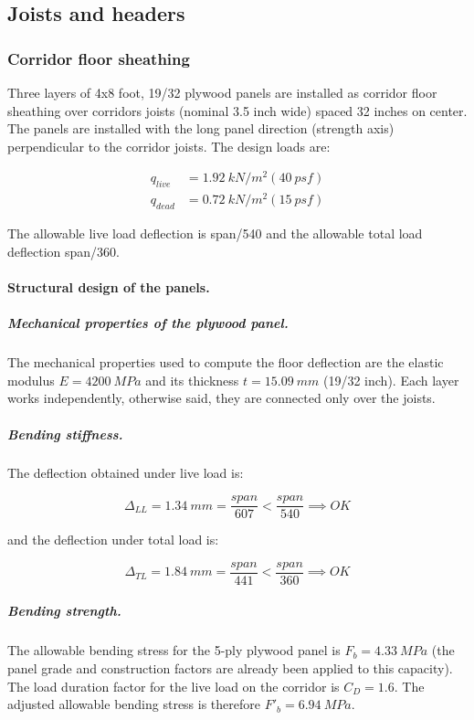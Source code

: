 \subsection{Joists and headers}

\subsubsection{Corridor floor sheathing}
Three layers of 4x8 foot, 19/32 plywood panels are installed as corridor floor sheathing over corridors joists (nominal 3.5 inch wide) spaced 32 inches on center. The panels are installed with the long panel direction (strength axis) perpendicular to the corridor joists. The design loads are:

\begin{align}
  q_{live}&= 1.92\ kN/m^2 (40\ psf) \\
  q_{dead}&= 0.72\ kN/m^2 (15\ psf)
\end{align}

The allowable live load deflection is span/540 and the allowable total load deflection span/360.

\paragraph{Structural design of the panels.}

\subparagraph{Mechanical properties of the plywood panel.}
The mechanical properties used to compute the floor deflection are the elastic modulus $E= 4200\ MPa$ and its thickness $t= 15.09\ mm$ (19/32 inch). Each layer works independently, otherwise said, they are connected only over the joists. 


\subparagraph{Bending stiffness.}
The deflection obtained under live load is:

\begin{equation}
  \Delta_{LL}= 1.34\ mm= \frac{span}{607} < \frac{span}{540} \implies OK
\end{equation}

\noindent and the deflection under total load is:

\begin{equation}
  \Delta_{TL}= 1.84\ mm= \frac{span}{441} < \frac{span}{360} \implies OK
\end{equation}

\subparagraph{Bending strength.}
The allowable bending stress for the 5-ply plywood panel is $F_b= 4.33\ MPa$ (the panel grade and construction factors are already been applied to this capacity). The load duration factor for the live load on the corridor is $C_D= 1.6$. The adjusted allowable bending stress is therefore $F'_b= 6.94\ MPa$.\\

